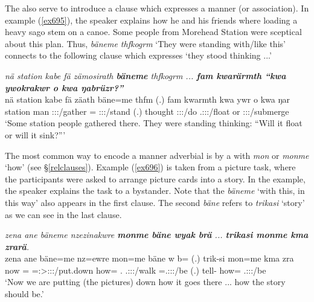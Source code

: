The   also serve to introduce a clause which expresses a manner (or  association). In example (\ref{ex695}), the speaker explains how he and his friends where loading a heavy sago stem on a canoe. Some people from Morehead Station were sceptical about this plan. Thus, \emph{bäneme thfkogrm} `They were standing with/like this' connects to the following clause which expresses `they stood thinking ...'

\begin{exe}
	\ex \emph{nä station kabe fä zämosirath \textbf{bäneme} thfkogrm ... \textbf{fam kwarärmth ``kwa ywokrakwr o kwa ŋabrüzr?''}}\\
	\gll nä station kabe fä zäath bäne=me thfm (.) fam kwarmth kwa ywr o kwa ŋar\\
	\Indf{} station man \Dist{} \Stpl:\Sbj:\Pst:\Pfv/gather \Recog=\Ins{} \Stpl:\Sbj:\Pst:\Dur/stand (.) thought \Stpl:\Sbj:\Pst:\Dur/do \Fut{} \Tsg.\Masc:\Sbj:\Nonpast:\Ipfv/float or \Fut{} \Stsg:\Sbj:\Nonpast:\Ipfv/submerge\\
	\trans `Some station people gathered there. They were standing thinking: ``Will it float or will it sink?'''
	\label{ex695}
\end{exe}

The most common way to encode a manner adverbial is by a  with \emph{mon} or \emph{monme} `how' (see \S{}\ref{relclauses}). Example (\ref{ex696}) is taken from a picture task, where the participants were asked to arrange picture cards into a story. In the example, the speaker explains the task to a bystander. Note that the  \emph{bäneme} `with this, in this way' also appears in the first clause. The second  \emph{bäne} refers to \emph{trikasi} `story' as we can see in the last clause.

\begin{exe}
	\ex \emph{zena ane bäneme nzezinakwre \textbf{monme bäne wyak brä} ... \textbf{trikasi monme kma zrarä}.}\\
	\gll zena ane bäne=me nz=ewre mon=me bäne w b= (.) trik-si mon=me kma zra\\
	now \Dem{} \Recog=\Ins{} \Immpst=\Fpl:\Sbj>\Stpl:\Obj:\Nonpast:\Ipfv/put.down how=\Ins{} \Recog.\Abs{} \Tsg.\F:\Sbj:\Nonpast:\Ipfv/walk \Med=\Tsg.\F:\Sbj:\Nonpast:\Ipfv/be (.) tell-\Nmlz{} how=\Ins{} \Pot{} \Tsg.\F:\Sbj:\Irr:\Ipfv/be\\
	\trans `Now we are putting (the pictures) down how it goes there ... how the story should be.'
	\label{ex696}
\end{exe}

